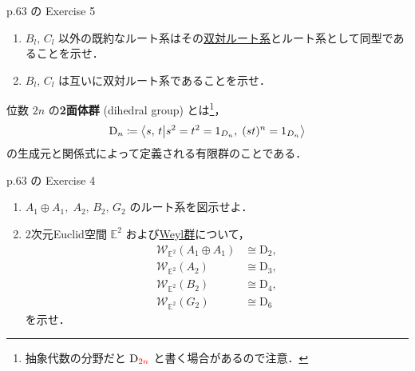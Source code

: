 \documentclass{ltjsarticle}
\theoremstyle{mystyle} %
\numberwithin{equation}{section}
\newcommand{\lto}{\longrightarrow}
\newcommand{\lmto}{\longmapsto}
\newcommand{\Weyl}[2]{\mathscr{W}_{#1}(#2)}
\begin{document}
\begin{myproblem}[label=ex:3-11-5]{p.63 の Exercise 5}
    \begin{enumerate}
        \item 
        $B_l,\, C_l$ 以外の既約なルート系はその\hyperref[def:dual-root]{双対ルート系}とルート系として同型であることを示せ．
        \item 
        $B_l,\, C_l$ は互いに双対ルート系であることを示せ．
    \end{enumerate}
\end{myproblem}

位数 $2n$ の\textbf{2面体群} (dihedral group) とは\footnote{抽象代数の分野だと $\mathrm{D}_{\textcolor{red}{2n}}$ と書く場合があるので注意．}，
\begin{align}
    \mathrm{D}_n \coloneqq \braket{s,\, t}{s^2 = t^2 = 1_{D_n},\; (st)^n = 1_{D_n}}
\end{align}
の生成元と関係式によって定義される有限群のことである．

\begin{myproblem}[label=ex:3-9-4]{p.63 の Exercise 4}
    \begin{enumerate}
        \item 
        $A_1 \oplus A_1,\; A_2,\, B_2,\, G_2$ のルート系を図示せよ．
        \item 
        2次元Euclid空間 $\mathbb{E}^2$ および\hyperref[def:Weylgroup]{Weyl群}について，
        \begin{align}
            \Weyl{\mathbb{E}^2}{A_1 \oplus A_1} &\cong \mathrm{D}_2, \\
            \Weyl{\mathbb{E}^2}{A_2} &\cong \mathrm{D}_3, \\
            \Weyl{\mathbb{E}^2}{B_2} &\cong \mathrm{D}_4, \\
            \Weyl{\mathbb{E}^2}{G_2} &\cong \mathrm{D}_6
        \end{align}
        を示せ．
    \end{enumerate}
\end{myproblem}

\end{document}
